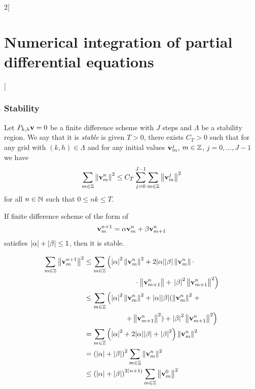 \documentclass[../../../main_math.tex]{subfiles}
\begin{document}
\begin{multicols}{2}[\section{Numerical integration of partial differential equations}]
  \subsubsection{Stability}
  \begin{definition}
    Let $P_{k,h}\boldsymbol{\mathrm{v}}=0$ be a finite difference scheme with $J$ steps and $\Lambda$ be a stability region. We say that it is \emph{stable} is given $T>0$, there exists $C_T>0$ such that for any grid with $(k,h)\in \Lambda$ and for any initial values $\boldsymbol{\mathrm{v}}_m^j$, $m\in\mathbb{Z}$, $j=0,\ldots,J-1$ we have $$\sum_{m\in\mathbb{Z}}\left\|\boldsymbol{\mathrm{v}}_m^n\right\|^2\leq C_T\sum_{j=0}^{J-1}\sum_{m\in\mathbb{Z}}\left\|\boldsymbol{\mathrm{v}}_m^j\right\|^2$$ for all $n\in\mathbb{N}$ such that $0\leq nk\leq T$.
  \end{definition}
  \begin{lemma}
    If finite difference scheme of the form of $$\boldsymbol{\mathrm{v}}_m^{n+1}=\alpha \boldsymbol{\mathrm{v}}_m^n+\beta \boldsymbol{\mathrm{v}}_{m+1}^n$$ satisfies $\abs{\alpha}+\abs{\beta}\leq 1$, then it is stable.
  \end{lemma}
  \begin{sproof}
    \begin{align*}
      \sum_{m\in\mathbb{Z}}\left\|\boldsymbol{\mathrm{v}}_m^{n+1}\right\|^2 & \leq \sum_{m\in\mathbb{Z}}\left(\abs{\alpha}^2\left\|\boldsymbol{\mathrm{v}}_m^n\right\|^2+2\abs{\alpha}\abs{\beta}\left\|\boldsymbol{\mathrm{v}}_m^n\right\|\cdot\right. \\
                                            & \hspace{2.5cm}\cdot\left\|\boldsymbol{\mathrm{v}}_{m+1}^n\right\|+\left.\abs{\beta}^2\left\|\boldsymbol{\mathrm{v}}_{m+1}^n\right\|^2\right)
      \\
                                            & \leq \sum_{m\in\mathbb{Z}}\left(\abs{\alpha}^2\left\|\boldsymbol{\mathrm{v}}_m^n\right\|^2+\abs{\alpha}\abs{\beta}(\left\|\boldsymbol{\mathrm{v}}_m^n\right\|^2 \right.+  \\
                                            & \hspace{2cm}\left.+\left\|\boldsymbol{\mathrm{v}}_{m+1}^n\right\|^2)+\abs{\beta}^2\left\|\boldsymbol{\mathrm{v}}_{m+1}^n\right\|^2\right)                          \\
                                            & = \sum_{m\in\mathbb{Z}}\left(\abs{\alpha}^2+2\abs{\alpha}\abs{\beta}+\abs{\beta}^2\right)\left\|\boldsymbol{\mathrm{v}}_{m}^n\right\|^2          \\
                                            & ={(\abs{\alpha}+\abs{\beta})}^2 \sum_{m\in\mathbb{Z}}\left\|\boldsymbol{\mathrm{v}}_{m}^n\right\|^2                                              \\
                                            & \leq{(\abs{\alpha}+\abs{\beta})}^{2(n+1)} \sum_{m\in\mathbb{Z}}\left\|\boldsymbol{\mathrm{v}}_{m}^0\right\|^2
    \end{align*}

\end{sproof}
\end{multicols}
\end{document}
